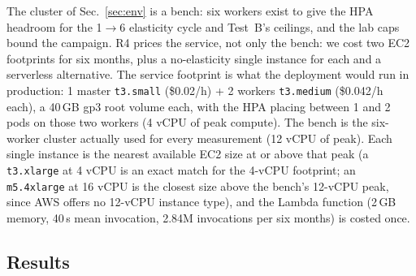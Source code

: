 \documentclass[conference]{IEEEtran}
\newcommand{\code}[1]{\texttt{#1}}
\begin{document}
The cluster of Sec.~\ref{sec:env} is a bench: six workers exist to give the
HPA headroom for the 1$\to$6 elasticity cycle and Test~B's ceilings, and the
lab caps bound the campaign. R4 prices the service, not only the bench: we
cost two EC2 footprints for six months, plus a no-elasticity single instance
for each and a serverless alternative. The service footprint is what the
deployment would run in production: 1 master \code{t3.small} (\$0.02/h) + 2
workers \code{t3.medium} (\$0.042/h each), a 40\,GB gp3 root volume each,
with the HPA placing between 1 and 2 pods on those two workers (4 vCPU of
peak compute). The bench is the six-worker cluster actually used for every
measurement (12 vCPU of peak). Each single instance is the nearest
available EC2 size at or above that peak (a \code{t3.xlarge} at 4 vCPU is an
exact match for the 4-vCPU footprint; an \code{m5.4xlarge} at 16 vCPU is the
closest size above the bench's 12-vCPU peak, since AWS offers no 12-vCPU
instance type), and
the Lambda function (2\,GB memory, 40\,s mean invocation, 2.84M invocations
per six months) is costed once.

\subsection{Results}

\begin{table}[t]
\caption{Six-month cost projection (service footprint and measurement bench)}
\label{tab:cost}
\centering\small
{}
\end{table}
\end{document}
